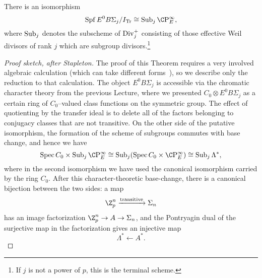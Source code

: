 \begin{theorem}
There is an isomorphism \[\Spf E^0 B\Sigma_j / I_{\Tr} \cong \Sub_j \CP^\infty_E,\] where \(\operatorname{Sub}_j\) denotes the subscheme of \(\operatorname{Div}_j^+\) consisting of those effective Weil divisors of rank \(j\) which are subgroup divisors.\footnote{If \(j\) is not a power of \(p\), this is the terminal scheme.}
\end{theorem}
\begin{proof}[Proof sketch, after Stapleton]
The proof of this Theorem requires a very involved algebraic calculation (which can take different forms~\cite{StricklandFiniteSubgps,SchlankStapleton}), so we describe only the reduction to that calculation.  The object \(E^0 B\Sigma_j\) is accessible via the chromatic character theory from the previous Lecture, where we presented \(C_0 \otimes E^0 B\Sigma_j\) as a certain ring of \(C_0\)--valued class functions on the symmetric group.  The effect of quotienting by the transfer ideal is to delete all of the factors belonging to conjugacy classes that are not transitive.  On the other side of the putative isomorphism, the formation of the scheme of subgroups commutes with base change, and hence we have \[\Spec C_0 \times \Sub_j \CP^\infty_E \cong \Sub_j (\Spec C_0 \times \CP^\infty_E) \cong \Sub_j \Lambda^*,\] where in the second isomorphism we have used the canonical isomorphism carried by the ring $C_0$.  After this character-theoretic base-change, there is a canonical bijection between the two sides: a map \[\Z_p^n \xrightarrow{\mathrm{transitive}} \Sigma_n\] has an image factorization \(\Z_p^n \to A \to \Sigma_n\), and the Pontryagin dual of the surjective map in the factorization gives an injective map \[\Lambda^* \leftarrow A^*.\]


\end{proof}
